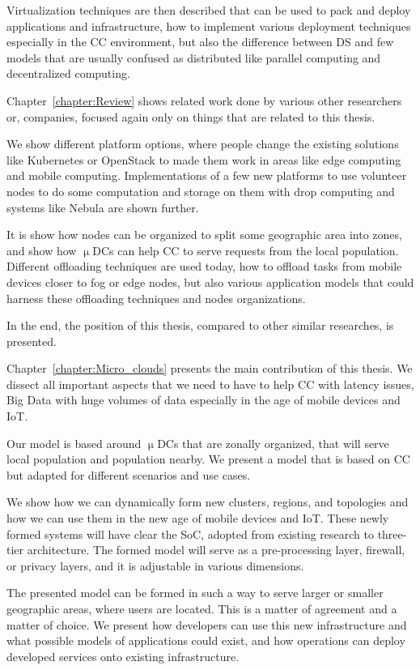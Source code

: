 Virtualization techniques are then described that can be used to pack and deploy applications and infrastructure, how to implement various deployment techniques especially in the CC environment, but also the difference between DS and few models that are usually confused as distributed like parallel computing and decentralized computing.

Chapter~\ref{chapter:Review} shows related work done by various other researchers or, companies, focused again only on things that are related to this thesis.

We show different platform options, where people change the existing solutions like Kubernetes or OpenStack to made them work in areas like edge computing and mobile computing. Implementations of a few new platforms to use volunteer nodes to do some computation and storage on them with drop computing and systems like Nebula are shown further.

It is show how nodes can be organized to split some geographic area into zones, and show how $\upmu$DCs can help CC to serve requests from the local population. Different offloading techniques are used today, how to offload tasks from mobile devices closer to fog or edge nodes, but also various application models that could harness these offloading techniques and nodes organizations.

In the end, the position of this thesis, compared to other similar researches, is presented.

Chapter~\ref{chapter:Micro_clouds} presents the main contribution of this thesis. We dissect all important aspects that we need to have to help CC with latency issues, Big Data with huge volumes of data especially in the age of mobile devices and IoT.

Our model is based around $\upmu$DCs that are zonally organized, that will serve local population and population nearby. We present a model that is based on CC but adapted for different scenarios and use cases.

We show how we can dynamically form new clusters, regions, and topologies and how we can use them in the new age of mobile devices and IoT. These newly formed systems will have clear the SoC, adopted from existing research to three-tier architecture. The formed model will serve as a pre-processing layer, firewall, or privacy layers, and it is adjustable in various dimensions.

The presented model can be formed in such a way to serve larger or smaller geographic areas, where users are located. This is a matter of agreement and a matter of choice. We present how developers can use this new infrastructure and what possible models of applications could exist, and how operations can deploy developed services onto existing infrastructure.

